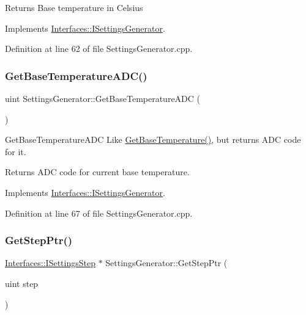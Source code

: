 \begin{DoxyReturn}{Returns}
Base temperature in Celsius 
\end{DoxyReturn}


Implements \hyperlink{class_interfaces_1_1_i_settings_generator_a9cc36185b446f21e09a0e5633f39a1c5}{Interfaces\+::\+I\+Settings\+Generator}.



Definition at line 62 of file Settings\+Generator.\+cpp.

\mbox{\label{class_settings_generator_a5f3f78597f001c127b89f6447a46df09}} 
\subsubsection{\texorpdfstring{Get\+Base\+Temperature\+A\+D\+C()}{GetBaseTemperatureADC()}}
{\footnotesize\ttfamily uint Settings\+Generator\+::\+Get\+Base\+Temperature\+A\+DC (\begin{DoxyParamCaption}{ }\end{DoxyParamCaption})\hspace{0.3cm}{\ttfamily [virtual]}}



Get\+Base\+Temperature\+A\+DC Like \hyperlink{class_settings_generator_a80b1ff8060a16d149989d98a88ab253e}{Get\+Base\+Temperature()}, but returns A\+DC code for it. 

\begin{DoxyReturn}{Returns}
A\+DC code for current base temperature. 
\end{DoxyReturn}


Implements \hyperlink{class_interfaces_1_1_i_settings_generator_a1000ff41c6eecdb55a46c859ca0ebe67}{Interfaces\+::\+I\+Settings\+Generator}.



Definition at line 67 of file Settings\+Generator.\+cpp.

\mbox{\label{class_settings_generator_a37f4175a0ed24853b2f187f15505086b}} 
\subsubsection{\texorpdfstring{Get\+Step\+Ptr()}{GetStepPtr()}}
{\footnotesize\ttfamily \hyperlink{class_interfaces_1_1_i_settings_step}{Interfaces\+::\+I\+Settings\+Step} $\ast$ Settings\+Generator\+::\+Get\+Step\+Ptr (\begin{DoxyParamCaption}\item[{uint}]{step }\end{DoxyParamCaption})\hspace{0.3cm}{\ttfamily [virtual]}}



